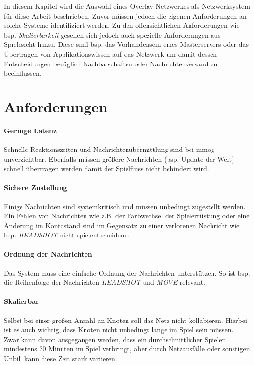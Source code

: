 In diesem Kapitel wird die Auswahl eines Overlay-Netzwerkes als Netzwerksystem für diese Arbeit beschrieben. Zuvor müssen jedoch die eigenen Anforderungen an solche Systeme identifiziert werden. Zu den offensichtlichen Anforderungen wie bsp. \emph{Skalierbarkeit} gesellen sich jedoch auch spezielle Anforderungen aus Spielesicht hinzu. Diese sind bsp. das Vorhandensein eines Masterservers oder das Übertragen von Applikationswissen auf das Netzwerk um damit dessen Entscheidungen bezüglich Nachbarschaften oder Nachrichtenversand zu beeinflussen.

\section{Anforderungen}


\paragraph{Geringe Latenz} Schnelle Reaktionszeiten und Nachrichtenübermittlung sind bei \ac{mmog} unverzichtbar. Ebenfalls müssen größere Nachrichten (bsp. Update der Welt) schnell übertragen werden damit der Spielfluss nicht behindert wird.

\paragraph{Sichere Zustellung} Einige Nachrichten sind systemkritisch und müssen unbedingt zugestellt werden. Ein Fehlen von Nachrichten wie z.B. der Farbwechsel der Spielerrüstung oder eine Änderung im Kontostand sind im Gegensatz zu einer verlorenen Nachricht wie bsp. \emph{HEADSHOT} nicht spielentscheidend. 

\paragraph{Ordnung der Nachrichten} Das System muss eine einfache Ordnung der Nachrichten unterstützen. So ist bsp. die Reihenfolge der Nachrichten \emph{HEADSHOT} und \emph{MOVE} relevant.

\paragraph{Skalierbar} Selbst bei einer großen Anzahl an Knoten soll das Netz nicht kollabieren. Hierbei ist es auch wichtig, dass Knoten nicht unbedingt lange im Spiel sein müssen. Zwar kann davon ausgegangen werden, dass ein durchschnittlicher Spieler mindestens 30 Minuten im Spiel verbringt, aber durch Netzausfälle oder sonstigen Unbill kann diese Zeit stark variieren.

